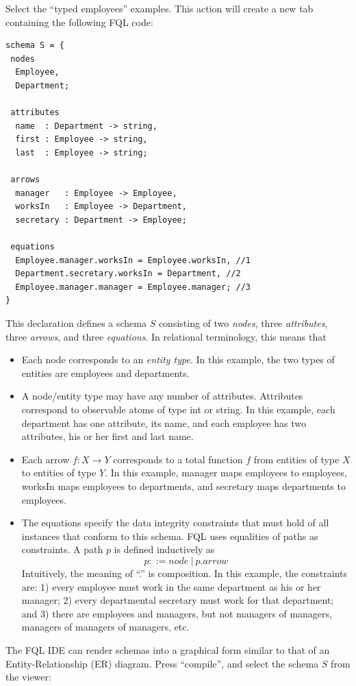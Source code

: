 \documentclass[12pt]{article}
\begin{document}
Select the ``typed employees'' examples.  This action will create a new tab containing the following FQL code:
\begin{verbatim}
schema S = { 
 nodes
  Employee, 
  Department;
  
 attributes
  name  : Department -> string,
  first : Employee -> string,
  last  : Employee -> string;
  
 arrows
  manager   : Employee -> Employee,
  worksIn   : Employee -> Department,
  secretary : Department -> Employee;
   
 equations  
  Employee.manager.worksIn = Employee.worksIn, //1
  Department.secretary.worksIn = Department, //2
  Employee.manager.manager = Employee.manager; //3
}
\end{verbatim}
This declaration defines a schema $S$ consisting of two {\it nodes}, three {\it attributes}, three {\it arrows}, and three {\it equations}. In relational terminology, this means that   
\begin{itemize}
\item Each node corresponds to an {\it entity type}.  In this example, the two types of entities are employees and departments.
\item A node/entity type may have any number of attributes.  Attributes correspond to observable atoms of type int or string.  In this example, each department has one attribute, its name, and each employee has two attributes, his or her first and last name.
\item Each arrow $f : X \to Y$ corresponds to a total function $f$ from entities of type $X$ to entities of type $Y$.   In this example, manager maps employees to employees, worksIn maps employees to departments, and secretary maps departments to employees.
\item The equations specify the data integrity constraints that must hold of all instances that conform to this schema.  FQL uses equalities of paths as constraints.  A path $p$ is defined inductively as
$$
p ::= node \ | \ p.arrow
$$ 
Intuitively, the meaning of ``.'' is composition.  In this example, the constraints are: 1) every employee must work in the same department as his or her manager; 2) every departmental secretary must work for that department; and 3) there are employees and managers, but not managers of managers, managers of managers of managers, etc.
\end{itemize}
The FQL IDE can render schemas into a graphical form similar to that of an Entity-Relationship (ER) diagram.  Press ``compile'', and select the schema $S$ from the viewer:
\end{document}
